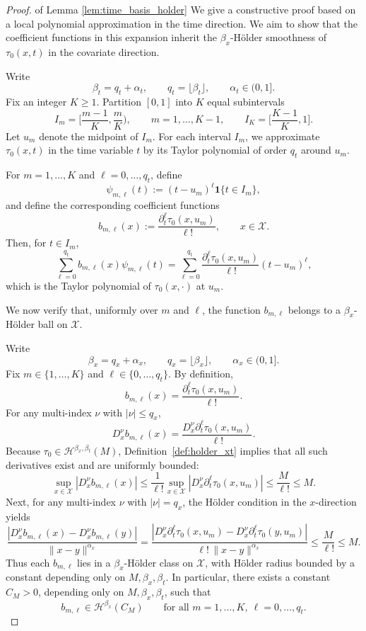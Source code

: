 \documentclass{article}
\begin{document}
\begin{proof}{of Lemma  \ref{lem:time_basis_holder}}
We give a constructive proof based on a local polynomial approximation in the time
direction. We aim to show that the coefficient functions in this expansion inherit
the \(\beta_x\)-H\"older smoothness of \(\tau_0(x,t)\) in the covariate direction.


Write
\[
\beta_t=q_t+\alpha_t,\qquad q_t=\lfloor \beta_t\rfloor,\qquad \alpha_t\in(0,1].
\]
Fix an integer \(K\ge 1\). Partition \([0,1]\) into \(K\) equal subintervals
\[
I_m=\Big[\frac{m-1}{K},\frac{m}{K}\Big),\qquad m=1,\ldots,K-1,
\qquad
I_K=\Big[\frac{K-1}{K},1\Big].
\]
Let \(u_m\) denote the midpoint of \(I_m\). For each interval \(I_m\), we approximate
\(\tau_0(x,t)\) in the time variable \(t\) by its Taylor polynomial of order \(q_t\)
around \(u_m\).

For \(m=1,\ldots,K\) and \(\ell=0,\ldots,q_t\), define
\[
\psi_{m,\ell}(t):=(t-u_m)^\ell \mathbf 1\{t\in I_m\},
\]
and define the corresponding coefficient functions
\[
b_{m,\ell}(x):=\frac{\partial_t^\ell \tau_0(x,u_m)}{\ell!},\qquad x\in\mathcal X.
\]
Then, for \(t\in I_m\),
\[
\sum_{\ell=0}^{q_t} b_{m,\ell}(x)\psi_{m,\ell}(t)
=
\sum_{\ell=0}^{q_t}\frac{\partial_t^\ell \tau_0(x,u_m)}{\ell!}(t-u_m)^\ell,
\]
which is the Taylor polynomial of \(\tau_0(x,\cdot)\) at \(u_m\).

 

We now verify that, uniformly over \(m\) and \(\ell\), the function
\(b_{m,\ell}\) belongs to a \(\beta_x\)-H\"older ball on \(\mathcal X\).

Write
\[
\beta_x=q_x+\alpha_x,\qquad q_x=\lfloor \beta_x\rfloor,\qquad \alpha_x\in(0,1].
\]
Fix \(m\in\{1,\ldots,K\}\) and \(\ell\in\{0,\ldots,q_t\}\). By definition,
\[
b_{m,\ell}(x)=\frac{\partial_t^\ell \tau_0(x,u_m)}{\ell!}.
\]
For any multi-index \(\nu\) with \(|\nu|\le q_x\),
\[
D_x^\nu b_{m,\ell}(x)
=
\frac{D_x^\nu \partial_t^\ell \tau_0(x,u_m)}{\ell!}.
\]
Because \(\tau_0\in \mathcal H^{\beta_x,\beta_t}(M)\), Definition~\ref{def:holder_xt}
implies that all such derivatives exist and are uniformly bounded:
\[
\sup_{x\in\mathcal X}|D_x^\nu b_{m,\ell}(x)|
\le
\frac{1}{\ell!}\sup_{x\in\mathcal X}|D_x^\nu\partial_t^\ell\tau_0(x,u_m)|
\le
\frac{M}{\ell!}
\le M.
\]
Next, for any multi-index \(\nu\) with \(|\nu|=q_x\), the H\"older condition in the
\(x\)-direction yields
\[
\frac{|D_x^\nu b_{m,\ell}(x)-D_x^\nu b_{m,\ell}(y)|}{\|x-y\|^{\alpha_x}}
=
\frac{|D_x^\nu \partial_t^\ell \tau_0(x,u_m)-D_x^\nu \partial_t^\ell \tau_0(y,u_m)|}
{\ell!\,\|x-y\|^{\alpha_x}}
\le
\frac{M}{\ell!}
\le M.
\]
Thus each \(b_{m,\ell}\) lies in a \(\beta_x\)-H\"older class on \(\mathcal X\),
with H\"older radius bounded by a constant depending only on \(M,\beta_x,\beta_t\).
In particular, there exists a constant \(C_M>0\), depending only on
\(M,\beta_x,\beta_t\), such that
\[
b_{m,\ell}\in \mathcal H^{\beta_x}(C_M)
\qquad\text{for all } m=1,\ldots,K,\ \ell=0,\ldots,q_t.
\]


\end{proof}
\end{document}
